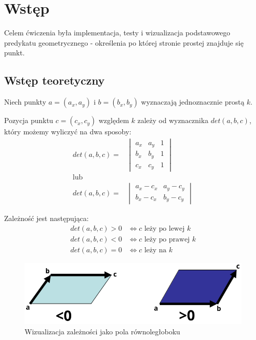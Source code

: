 \documentclass[11pt,a4paper]{article}
\begin{document}
\section{Wstęp}
Celem ćwiczenia była implementacja, testy i wizualizacja
podstawowego predykatu geometrycznego - określenia po 
której stronie prostej znajduje się punkt.
\subsection{Wstęp teoretyczny}
Niech punkty $a = (a_x,a_y)$ i $b = (b_x, b_y)$ wyznaczają jednoznacznie
prostą $k$. 

Pozycja punktu $c = (c_x, c_y)$ względem $k$ zależy od wyznacznika
$det(a, b, c)$, który możemy wyliczyć na dwa sposoby:
\begin{equation}
\begin{split}
    det(a, b, c) =&
    \begin{vmatrix}
        a_x & a_y & 1 \\
        b_x & b_y & 1 \\
        c_x & c_y & 1
    \end{vmatrix}
    \\
    \text{lub}
    \\
    det(a, b, c) =&
    \begin{vmatrix}
        a_x - c_x & a_y - c_y \\
        b_x - c_x & b_y - c_y
    \end{vmatrix}
\end{split}
\end{equation}

Zależność jest następująca:
\begin{equation}
\begin{split}
    det(a, b, c) > 0 &\iff c \text{ leży po lewej } k
    \\
    det(a, b, c) < 0 &\iff c \text{ leży po prawej } k
    \\
    det(a, b, c) = 0 &\iff c \text{ leży na } k
\end{split}
\end{equation}

\begin{figure}[H]
    \centering
    \includegraphics[scale=0.75]{res/example.png}
    \caption{Wizualizacja zależności jako pola równoległoboku}
\end{figure}
\end{document}
